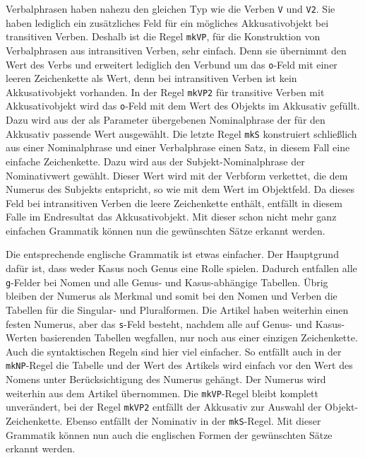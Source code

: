 Verbalphrasen haben nahezu den gleichen Typ wie die Verben \texttt{V} und \texttt{V2}. Sie haben lediglich ein zusätzliches Feld für ein mögliches Akkusativobjekt bei transitiven Verben. Deshalb ist die Regel \texttt{mkVP}, für die Konstruktion von Verbalphrasen aus intransitiven Verben, sehr einfach. Denn sie übernimmt den Wert des Verbs und erweitert lediglich den Verbund um das \texttt{o}-Feld mit einer leeren Zeichenkette als Wert, denn bei intransitiven Verben ist kein Akkusativobjekt vorhanden. In der Regel \texttt{mkVP2} für transitive Verben mit Akkusativobjekt wird das \texttt{o}-Feld mit dem Wert des Objekts im Akkusativ gefüllt. Dazu wird aus der als Parameter übergebenen Nominalphrase der für den Akkusativ passende Wert ausgewählt. Die letzte Regel \texttt{mkS} konstruiert schließlich aus einer Nominalphrase und einer Verbalphrase einen Satz, in diesem Fall eine einfache Zeichenkette. Dazu wird aus der Subjekt-Nominalphrase der Nominativwert gewählt. Dieser Wert wird mit der Verbform verkettet, die dem Numerus des Subjekts entspricht, so wie mit dem Wert im Objektfeld. Da dieses Feld bei intransitiven Verben die leere Zeichenkette enthält, entfällt in diesem Falle im Endresultat das Akkusativobjekt. Mit dieser schon nicht mehr ganz einfachen Grammatik können nun die gewünschten Sätze erkannt werden. \par

Die entsprechende englische Grammatik ist etwas einfacher. Der Hauptgrund dafür ist, dass weder Kasus noch Genus eine Rolle spielen. Dadurch entfallen alle \texttt{g}-Felder bei Nomen und alle Genus- und Kasus-abhängige Tabellen. Übrig bleiben der Numerus als Merkmal und somit bei den Nomen und Verben die Tabellen für die Singular- und Pluralformen. Die Artikel haben weiterhin einen festen Numerus, aber das \texttt{s}-Feld besteht, nachdem alle auf Genus- und Kasus-Werten basierenden Tabellen wegfallen, nur noch aus einer einzigen Zeichenkette. Auch die syntaktischen Regeln sind hier viel einfacher. So entfällt auch in der \texttt{mkNP}-Regel die Tabelle und der Wert des Artikels wird einfach vor den Wert des Nomens unter Berücksichtigung des Numerus gehängt. Der Numerus wird weiterhin aus dem Artikel übernommen. Die \texttt{mkVP}-Regel bleibt komplett unverändert, bei der Regel \texttt{mkVP2} entfällt der Akkusativ zur Auswahl der Objekt-Zeichenkette. Ebenso entfällt der Nominativ in der \texttt{mkS}-Regel. Mit dieser Grammatik können nun auch die englischen Formen der gewünschten Sätze erkannt werden. \par
